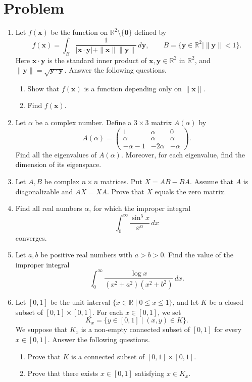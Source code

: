 \documentclass{article}
\begin{document}
\section*{Problem}
\begin{enumerate}[label=\fbox{\arabic*}]
  \item Let $f(\bm{x})$ be the function on $\mathbb{R}^2 \setminus \{\bm{0}\}$ defined by
        \[
          f(\bm{x}) = \int_B \frac{1}{|\bm{x} \cdot \bm{y}| + \|\bm{x}\|\|\bm{y}\|} \, d\bm{y}, \qquad B = \{ \bm{y} \in \mathbb{R}^2 \mid \|\bm{y}\| < 1 \}.
        \]
        Here $\bm{x} \cdot \bm{y}$ is the standard inner product of $\bm{x}, \bm{y} \in \mathbb{R}^2$ in $\mathbb{R}^2$, and $\|\bm{y}\| = \sqrt{\bm{y} \cdot \bm{y}}$. Answer the following questions.
        \begin{enumerate}[label=(\arabic*)]
          \item Show that $f(\bm{x})$ is a function depending only on $\|\bm{x}\|$.
          \item Find $f(\bm{x})$.
        \end{enumerate}

  \item Let $\alpha$ be a complex number. Define a $3 \times 3$ matrix $A(\alpha)$ by
        \[
          A(\alpha) = \begin{pmatrix} 1 & \alpha & 0 \\ \alpha & \alpha & \alpha \\ -\alpha - 1 & -2\alpha & -\alpha \end{pmatrix}.
        \]
        Find all the eigenvalues of $A(\alpha)$. Moreover, for each eigenvalue, find the dimension of its eigenspace.

  \item Let $A, B$ be complex $n \times n$ matrices. Put $X = AB - BA$. Assume that $A$ is diagonalizable and $AX = XA$. Prove that $X$ equals the zero matrix.

  \item Find all real numbers $\alpha$, for which the improper integral
        \[
          \int_0^\infty \frac{\sin^5 x}{x^\alpha} \, dx
        \]
        converges.

  \item Let $a, b$ be positive real numbers with $a > b > 0$. Find the value of the improper integral
        \[
          \int_0^\infty \frac{\log x}{(x^2 + a^2)(x^2 + b^2)} \, dx.
        \]

  \item Let $[0, 1]$ be the unit interval $\{ x \in \mathbb{R} \mid 0 \le x \le 1 \}$, and let $K$ be a closed subset of $[0, 1] \times [0, 1]$. For each $x \in [0, 1]$, we set
        \[
          K_x = \{ y \in [0, 1] \mid (x, y) \in K \}.
        \]
        We suppose that $K_x$ is a non-empty connected subset of $[0, 1]$ for every $x \in [0, 1]$. Answer the following questions.
        \begin{enumerate}[label=(\arabic*)]
          \item Prove that $K$ is a connected subset of $[0, 1] \times [0, 1]$.
          \item Prove that there exists $x \in [0, 1]$ satisfying $x \in K_x$.
        \end{enumerate}


\end{enumerate}
\end{document}
